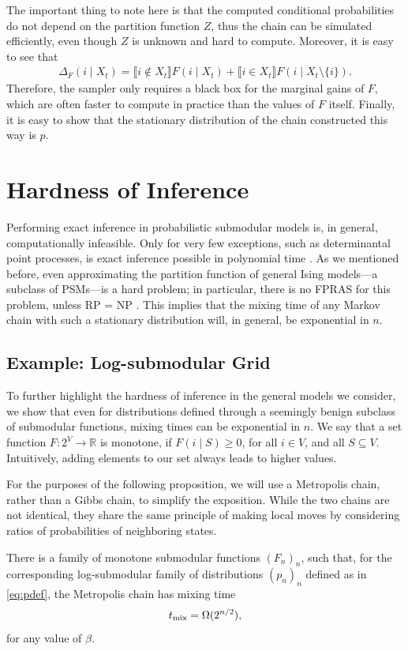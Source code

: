 The important thing to note here is that the computed conditional probabilities do not depend on the partition function $Z$, thus the chain can be simulated efficiently, even though $Z$ is unknown and hard to compute.
Moreover, it is easy to see that
\begin{align*}
\Delta_F(i \mid X_t) = \llbracket i\not\in X_t\rrbracket F(i \mid X_t) + \llbracket i\in X_t\rrbracket F(i \mid X_t\setminus\{i\}).
\end{align*}
Therefore, the sampler only requires a black box for the marginal gains of $F$, which are often faster to compute in practice than the values of $F$ itself.
Finally, it is easy to show that the stationary distribution of the chain constructed this way is $p$.

\section{Hardness of Inference}
Performing exact inference in probabilistic submodular models is, in general, computationally infeasible.
Only for very few exceptions, such as determinantal point processes, is exact inference possible in polynomial time \citep{kulesza12}.
As we mentioned before, even approximating the partition function of general Ising models---a subclass of PSMs---is a hard problem; in particular, there is no FPRAS for this problem, unless RP = NP \citep{jerrum93}.
This implies that the mixing time of any Markov chain with such a stationary distribution will, in general, be exponential in $n$.

\subsection{Example: Log-submodular Grid}
To further highlight the hardness of inference in the general models we consider, we show that even for distributions defined through a seemingly benign subclass of submodular functions, mixing times can be exponential in $n$.
We say that a set function $F : 2^V \to \mathbb{R}$ is monotone, if $F(i \mid S) \geq 0$, for all $i \in V$, and all $S \subseteq V$.
Intuitively, adding elements to our set always leads to higher values.

For the purposes of the following proposition, we will use a Metropolis chain, rather than a Gibbs chain, to simplify the exposition.
While the two chains are not identical, they share the same principle of making local moves by considering ratios of probabilities of neighboring states.
\begin{prop}
There is a family of monotone submodular functions $(F_n)_n$, such that, for the corresponding log-submodular family of distributions $(p_n)_n$ defined as in \eqref{eq:pdef}, the Metropolis chain has mixing time
\begin{align*}
  t_{\mathrm{mix}}  = \Omega(2^{n/2}),
\end{align*}
for any value of $\beta$.
\end{prop}

